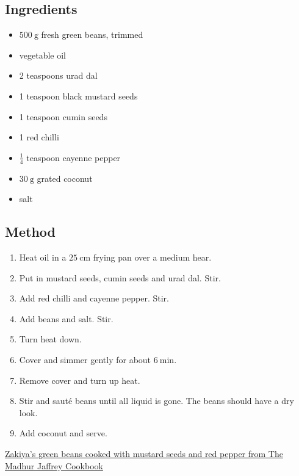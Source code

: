 \documentclass[11pt,a4paper]{article}
\begin{document}
\subsection*{Ingredients}

\begin{itemize}
  \item $ \qty{500}{\gram} $ fresh green beans, trimmed
  \item vegetable oil
  \item 2 teaspoons urad dal
  \item 1 teaspoon black mustard seeds
  \item 1 teaspoon cumin seeds
  \item 1 red chilli
  \item $ \frac{1}{4} $ teaspoon cayenne pepper
  \item $ \qty{30}{\gram} $ grated coconut
  \item salt
\end{itemize}

\medskip

\subsection*{Method}

\begin{enumerate}
  \item Heat oil in a $ \qty{25}{\cm} $ frying pan over a medium hear.
  \item Put in mustard seeds, cumin seeds and urad dal. Stir.
  \item Add red chilli and cayenne pepper. Stir.
  \item Add beans and salt. Stir.
  \item Turn heat down.
  \item Cover and simmer gently for about $ \qty{6}{\minute} $.
  \item Remove cover and turn up heat.
  \item Stir and sauté beans until all liquid is gone. The beans should have a dry look.
  \item Add coconut and serve.
\end{enumerate}

\href{https://www.eatyourbooks.com/library/recipes/2575259/zakiyas-green-beans-cooked-with}{Zakiya's green beans cooked with mustard seeds and red pepper from The Madhur Jaffrey Cookbook}
\end{document}
